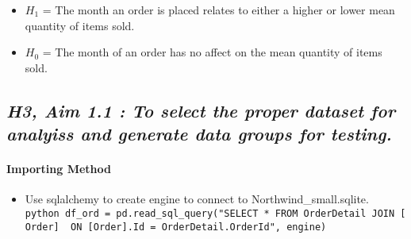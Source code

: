 \documentclass[11pt]{article}
\providecommand{\tightlist}{%
      \setlength{\itemsep}{0pt}\setlength{\parskip}{0pt}}
\begin{document}
\begin{itemize}
\tightlist
\item
  \(H_1\) = The month an order is placed relates to either a higher or
  lower mean quantity of items sold.
\item
  \(H_0\) = The month of an order has no affect on the mean quantity of
  items sold.
\end{itemize}

    \hypertarget{h3-aim-1.1-to-select-the-proper-dataset-for-analyiss-and-generate-data-groups-for-testing.}{%
\subsection{\texorpdfstring{\textbf{\emph{H3, Aim 1.1 : To select the
proper dataset for analyiss and generate data groups for
testing.}}}{H3, Aim 1.1 : To select the proper dataset for analyiss and generate data groups for testing.}}\label{h3-aim-1.1-to-select-the-proper-dataset-for-analyiss-and-generate-data-groups-for-testing.}}

\hypertarget{importing-method}{%
\paragraph{Importing Method}\label{importing-method}}

\begin{itemize}
\tightlist
\item
  Use sqlalchemy to create engine to connect to Northwind\_small.sqlite.
  \texttt{python\ df\_ord\ =\ pd.read\_sql\_query("SELECT\ *\ FROM\ OrderDetail\ JOIN\ {[}Order{]}\ \ ON\ {[}Order{]}.Id\ =\ OrderDetail.OrderId",\ engine)}
\end{itemize}
\end{document}
